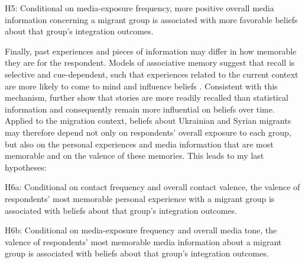 H5: Conditional on media-exposure frequency, more positive overall media information concerning a migrant group is 
associated with more favorable beliefs about that group’s integration outcomes.\bigskip

Finally, past experiences and pieces of information may differ in how memorable they are for the respondent. 
Models of associative memory suggest that recall is selective and cue-dependent, such that experiences related to the 
current context are more likely to come to mind and influence beliefs \citep{bordalo2023memory, enke2024associative}. 
Consistent with this mechanism, \citet{graeber2024stories} further show that stories are more readily recalled than 
statistical information and consequently remain more influential on beliefs over time. Applied to the migration context, 
beliefs about Ukrainian and Syrian migrants may therefore depend not only on respondents’ overall exposure to each group, 
but also on the personal experiences and media information that are most memorable and on the valence of these memories. 
This leads to my last hypotheses:\bigskip

H6a: Conditional on contact frequency and overall contact valence, the valence of respondents’ most memorable 
personal experience with a migrant group is associated with beliefs about that group’s integration outcomes.\bigskip

H6b: Conditional on media-exposure frequency and overall media tone, the valence of respondents’ most memorable 
media information about a migrant group is associated with beliefs about that group’s integration outcomes.
